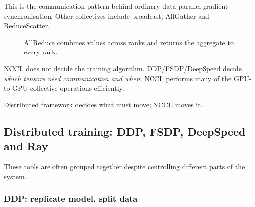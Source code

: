 This is the communication pattern behind ordinary data-parallel gradient synchronisation.
Other collectives include broadcast, AllGather and ReduceScatter.

\begin{figure}[ht]
\centering
{}
\caption{AllReduce combines values across ranks and returns the aggregate to every rank.}
\label{fig:nccl-allreduce}
\end{figure}

NCCL does not decide the training algorithm.
DDP/FSDP/DeepSpeed decide \emph{which tensors need communication and when}; NCCL performs many of the GPU-to-GPU collective operations efficiently.

\begin{calloutmemoryhook}
Distributed framework decides what must move; NCCL moves it.
\end{calloutmemoryhook}


\subsection{Distributed training: DDP, FSDP, DeepSpeed and Ray}

These tools are often grouped together despite controlling different parts of the system.

\subsubsection*{DDP: replicate model, split data}

